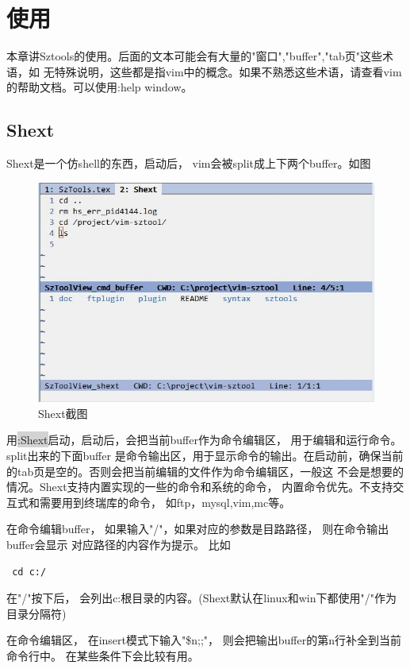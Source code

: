 \documentclass[oneside,openany]{book}
\begin{document}
\chapter{使用}
  本章讲Sztools的使用。后面的文本可能会有大量的"窗口","buffer","tab页"这些术语，如
无特殊说明，这些都是指vim中的概念。如果不熟悉这些术语，请查看vim的帮助文档。可以使用:help window。

  \section{Shext}
  Shext是一个仿shell的东西，启动后， vim会被split成上下两个buffer。如图
  \begin{figure}[htbp]%
  \centering
  \includegraphics[scale=0.5]{shext.jpg}
  \caption{Shext截图}
  \end{figure}
  

  用\colorbox{lightgray}{:Shext}启动，启动后，会把当前buffer作为命令编辑区， 用于编辑和运行命令。 split出来的下面buffer
是命令输出区，用于显示命令的输出。在启动前，确保当前的tab页是空的。否则会把当前编辑的文件作为命令编辑区，一般这
不会是想要的情况。Shext支持内置实现的一些的命令和系统的命令， 内置命令优先。不支持交互式和需要用到终瑞库的命令， 如ftp，mysql,vim,mc等。 

  在命令编辑buffer， 如果输入"/"，如果对应的参数是目路路径， 则在命令输出buffer会显示
对应路径的内容作为提示。 比如 
  \begin{verbatim} cd c:/ \end{verbatim}
 在"/"按下后， 会列出c:根目录的内容。(Shext默认在linux和win下都使用"/"作为目录分隔符)

  在命令编辑区， 在insert模式下输入"\$n;;"， 则会把输出buffer的第n行补全到当前命令行中。
在某些条件下会比较有用。
\end{document}
